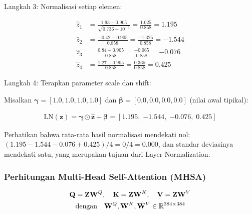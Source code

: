 \noindent Langkah 3: Normalisasi setiap elemen:
 
\vspace{0.5cm}
\begin{align*}
  \hat{z}_1 &= \frac{1.93 - 0.905}{\sqrt{0.736 + 10^{-6}}}
             = \frac{1.025}{0.858} = \mathbf{1.195} \\[4pt]
  \hat{z}_2 &= \frac{-0.42 - 0.905}{0.858}
             = \frac{-1.325}{0.858} = \mathbf{-1.544} \\[4pt]
  \hat{z}_3 &= \frac{0.84 - 0.905}{0.858}
             = \frac{-0.065}{0.858} = \mathbf{-0.076} \\[4pt]
  \hat{z}_4 &= \frac{1.27 - 0.905}{0.858}
             = \frac{0.365}{0.858} = \mathbf{0.425}
\end{align*}
\vspace{0.5cm}
 
\noindent Langkah 4: Terapkan parameter scale dan shift:
 
\vspace{0.5cm}
\noindent
Misalkan $\boldsymbol{\gamma} = [1.0, 1.0, 1.0, 1.0]$ dan
$\boldsymbol{\beta} = [0.0, 0.0, 0.0, 0.0]$ (nilai awal tipikal):
 
\vspace{0.5cm}
\begin{align*}
  \mathrm{LN}(\mathbf{z})
  = \boldsymbol{\gamma} \odot \hat{\mathbf{z}} + \boldsymbol{\beta}
  = [\mathbf{1.195},\; \mathbf{-1.544},\; \mathbf{-0.076},\; \mathbf{0.425}]
\end{align*}
\vspace{0.5cm}
 
\noindent
Perhatikan bahwa rata-rata hasil normalisasi mendekati nol:
$(1.195 - 1.544 - 0.076 + 0.425)/4 = 0/4 = 0.000$,
dan standar deviasinya mendekati satu, yang merupakan tujuan
dari Layer Normalization.
 
 
\subsubsection{Perhitungan Multi-Head Self-Attention (MHSA)}
 
\vspace{0.5cm}
\begin{align}
  \mathbf{Q} &= \mathbf{Z}\mathbf{W}^Q,\quad
  \mathbf{K} = \mathbf{Z}\mathbf{W}^K,\quad
  \mathbf{V} = \mathbf{Z}\mathbf{W}^V \notag \\
  &\text{dengan}\quad \mathbf{W}^Q,\mathbf{W}^K,\mathbf{W}^V \in \mathbb{R}^{384\times384}
\end{align}
\vspace{0.5cm}
 
